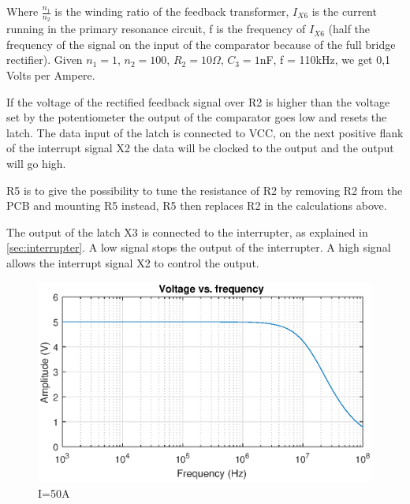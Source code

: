 
Where $\frac{n_1}{n_2}$ is the winding ratio of the feedback transformer, $I_{X6}$ is the current running in the primary resonance circuit, f is the frequency of $I_{X6}$ (half the frequency of the signal on the input of the comparator because of the full bridge rectifier). Given $n_1 = 1$, $n_2 = 100$, $R_2 = 10\Omega$, $C_3 = 1$nF, f = 110kHz, we get 0,1 Volts per Ampere.

If the voltage of the rectified feedback signal over R2 is higher than the voltage set by the potentiometer the output of the comparator goes low and resets the latch. The data input of the latch is connected to VCC, on the next positive flank of the interrupt signal X2 the data will be clocked to the output and the output will go high.

R5 is to give the possibility to tune the resistance of R2 by removing R2 from the PCB and mounting R5 instead, R5 then replaces R2 in the calculations above.

The output of the latch X3 is connected to the interrupter, as explained in \cref{sec:interrupter}. A low signal stops the output of the interrupter. A high signal allows the interrupt signal X2 to control the output.


\begin{figure}
    \centering
    \includegraphics[width=\textwidth]{img/LimiterTransfer.eps}
    \caption{I=50A}
    \label{fig:limitertransfer}
\end{figure}




